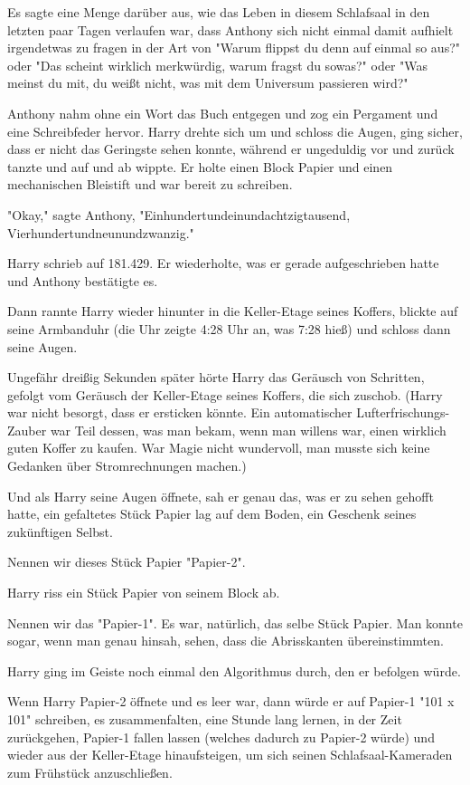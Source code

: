 {Es sagte eine Menge darüber aus, wie das Leben in diesem Schlafsaal in den letzten paar Tagen verlaufen war, dass Anthony sich nicht einmal damit aufhielt irgendetwas zu fragen in der Art von "Warum flippst du denn auf einmal so aus?" oder "Das scheint wirklich merkwürdig, warum fragst du sowas?" oder "Was meinst du mit, du weißt nicht, was mit dem Universum passieren wird?"

Anthony nahm ohne ein Wort das Buch entgegen und zog ein Pergament und eine Schreibfeder hervor. Harry drehte sich um und schloss die Augen, ging sicher, dass er nicht das Geringste sehen konnte, während er ungeduldig vor und zurück tanzte und auf und ab wippte. Er holte einen Block Papier und einen mechanischen Bleistift und war bereit zu schreiben.

"Okay," sagte Anthony, "Einhundertundeinundachtzigtausend, Vierhundertundneunundzwanzig."

Harry schrieb auf 181.429. Er wiederholte, was er gerade aufgeschrieben hatte und Anthony bestätigte es.

Dann rannte Harry wieder hinunter in die Keller-Etage seines Koffers, blickte auf seine Armbanduhr (die Uhr zeigte 4:28 Uhr an, was 7:28 hieß) und schloss dann seine Augen.

Ungefähr dreißig Sekunden später hörte Harry das Geräusch von Schritten, gefolgt vom Geräusch der Keller-Etage seines Koffers, die sich zuschob. (Harry war nicht besorgt, dass er ersticken könnte. Ein automatischer Lufterfrischungs-Zauber war Teil dessen, was man bekam, wenn man willens war, einen wirklich guten Koffer zu kaufen. War Magie nicht wundervoll, man musste sich keine Gedanken über Stromrechnungen machen.)

Und als Harry seine Augen öffnete, sah er genau das, was er zu sehen gehofft hatte, ein gefaltetes Stück Papier lag auf dem Boden, ein Geschenk seines zukünftigen Selbst.

Nennen wir dieses Stück Papier "Papier-2".

Harry riss ein Stück Papier von seinem Block ab.

Nennen wir das "Papier-1". Es war, natürlich, das selbe Stück Papier. Man konnte sogar, wenn man genau hinsah, sehen, dass die Abrisskanten übereinstimmten.

Harry ging im Geiste noch einmal den Algorithmus durch, den er befolgen würde.

Wenn Harry Papier-2 öffnete und es leer war, dann würde er auf Papier-1 "101 x 101" schreiben, es zusammenfalten, eine Stunde lang lernen, in der Zeit zurückgehen, Papier-1 fallen lassen (welches dadurch zu Papier-2 würde) und wieder aus der Keller-Etage hinaufsteigen, um sich seinen Schlafsaal-Kameraden zum Frühstück anzuschließen.

}
